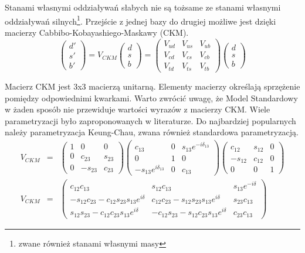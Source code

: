 Stanami własnymi oddziaływań słabych nie są tożsame ze stanami własnymi oddziaływań silnych\footnote{zwane również stanami własnymi masy}. Przejście z jednej bazy do drugiej możliwe jest dzięki macierzy Cabbibo-Kobayashiego-Maskawy (CKM).
\begin{equation}
\begin{pmatrix}
d'\\ s' \\b'
\end{pmatrix} =V_{CKM} 
\begin{pmatrix}
d\\ s \\b
\end{pmatrix}=\begin{pmatrix}
V_{ud}& V_{us}&V_{ub}\\ V_{cd}& V_{cs}&V_{cb} \\ V_{td}& V_{ts}&V_{tb}
\end{pmatrix} \begin{pmatrix}
d\\ s \\b
\end{pmatrix}
\end{equation}

Macierz CKM jest 3x3 macierzą unitarną. Elementy macierzy określają sprzężenie pomiędzy odpowiednimi kwarkami. Warto zwrócić uwagę, że Model Standardowy w żaden sposób nie przewiduje wartości wyrazów z macierzy CKM. 
Wiele parametryzacji było zaproponowanych w literaturze. Do najbardziej popularnych należy parametryzacja Keung-Chau, zwana również standardowa parametryzacją. 
\begin{eqnarray}
V_{CKM}&=&\begin{pmatrix} 1 & 0 & 0 \\ 0 & c_{23} & s_{23} \\ 0 & -s_{23} & c_{23} \end{pmatrix}
 \begin{pmatrix} c_{13} & 0 & s_{13}e^{-i\delta_{13}} \\ 0 & 1 & 0 \\ -s_{13}e^{i\delta_{13}} & 0 & c_{13} \end{pmatrix}
 \begin{pmatrix} c_{12} & s_{12} & 0 \\ -s_{12} & c_{12} & 0 \\ 0 & 0 & 1 \end{pmatrix} \nonumber \\
V_{CKM}&=&\begin{pmatrix}
c_{12}c_{13}&s_{12}c_{13}& s_{13}e^{-i\delta} \\
 -s_{12}c_{23}-c_{12}s_{23}s_{13}e^{i\delta} & c_{12}c_{23}-s_{12}s_{23}s_{13}e^{i\delta}  & s_{23}c_{13}\\ s_{12}s_{23}-c_{12}c_{23}s_{13}e^{i\delta} & -c_{12}s_{23}-s_{12}c_{23}s_{13}e^{i\delta} & c_{23}c_{13}
\end{pmatrix}
\end{eqnarray}

